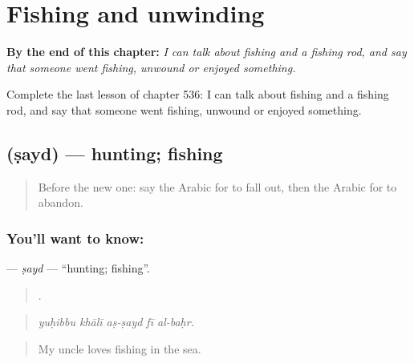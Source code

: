 
\chapter{Fishing and unwinding}
\label{ch:ar-fishing-and-unwinding}

\begin{chapteropening}
\textbf{By the end of this chapter:} \emph{I can talk about fishing and a fishing rod, and say that someone went fishing, unwound or enjoyed something.}

Complete the last lesson of chapter 536: I can talk about fishing and a fishing rod, and say that someone went fishing, unwound or enjoyed something.
\end{chapteropening}

\section[\texorpdfstring{\ar{صيد} (ṣayd)}{صيد (ṣayd)}]{ (ṣayd) — hunting; fishing}

\label{lesson:AR-C536-sayd}



\begin{quote}
Before the new one: say the Arabic for to fall out, then the Arabic for to abandon.
\end{quote}

\subsection*{You'll want to know: }
\textbf{} — \emph{ṣayd} — \textquotedblleft{}hunting; fishing\textquotedblright{}.

\begin{quote}
    .
\end{quote}

\begin{quote}
\emph{yuḥibbu khālī aṣ-ṣayd fī al-baḥr.}
\end{quote}

\begin{quote}
My uncle loves fishing in the sea.
\end{quote}

